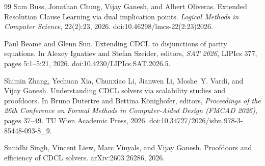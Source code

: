 \documentclass[11pt]{article}
\begin{document}
\begin{thebibliography}{99}
Sam Buss, Jonathan Chung, Vijay Ganesh, and Albert Oliveras.
\newblock Extended Resolution Clause Learning via dual implication points.
\newblock \emph{Logical Methods in Computer Science}, 22(2):23, 2026.
\newblock doi:10.46298/lmcs-22(2:23)2026.

Paul Beame and Glenn Sun.
\newblock Extending CDCL to disjunctions of parity equations.
\newblock In Alexey Ignatiev and Stefan Szeider, editors, \emph{SAT 2026}, LIPIcs 377, pages 5:1--5:21, 2026.
\newblock doi:10.4230/LIPIcs.SAT.2026.5.

Shimin Zhang, Yechuan Xia, Chunxiao Li, Jianwen Li, Moshe~Y. Vardi, and Vijay Ganesh.
\newblock Understanding CDCL solvers via scalability studies and proofdoors.
\newblock In Bruno Dutertre and Bettina Könighofer, editors, \emph{Proceedings of the 26th Conference on Formal Methods in Computer-Aided Design (FMCAD 2026)}, pages 37--49. TU Wien Academic Press, 2026.
\newblock doi:10.34727/2026/isbn.978-3-85448-093-8\_9.

Sunidhi Singh, Vincent Liew, Marc Vinyals, and Vijay Ganesh.
\newblock Proofdoors and efficiency of CDCL solvers.
\newblock arXiv:2603.26286, 2026.

\end{thebibliography}
\end{document}

